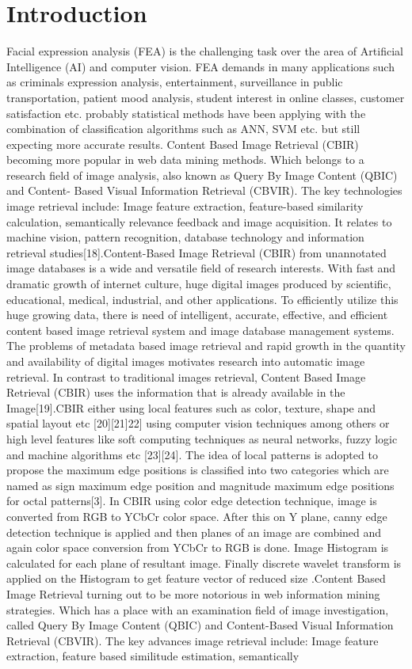 \documentclass[review]{elsarticle}
\begin{document}
\section{Introduction}
\label{intro-chapter}
Facial expression analysis (FEA) is the challenging task over the area of Artificial Intelligence (AI) and computer vision. FEA demands in many applications such as criminals expression analysis, entertainment, surveillance in public transportation, patient mood analysis, student interest in online classes, customer satisfaction etc. probably statistical methods have been applying with the combination of classification algorithms such as ANN, SVM etc. but still expecting more accurate results.
Content Based Image Retrieval (CBIR) becoming more popular in web data mining methods. Which belongs to a research field of image analysis, also known as Query By Image Content (QBIC) and Content- Based Visual Information Retrieval (CBVIR). The key technologies image retrieval include: Image feature extraction, feature-based similarity calculation, semantically relevance feedback and image acquisition. It relates to machine vision, pattern recognition, database technology and information retrieval studies[18].Content-Based Image Retrieval (CBIR) from unannotated image databases is a wide and versatile field of research interests. With fast and dramatic growth of internet culture, huge digital images produced by scientific, educational, medical, industrial, and other applications. To efficiently utilize this huge growing data, there is need of intelligent, accurate, effective, and efficient content based image retrieval system and image database management systems. The problems of metadata based image retrieval and rapid growth in the quantity and availability of digital images motivates research into automatic image retrieval. In contrast to traditional images retrieval, Content Based Image Retrieval (CBIR) uses the information that is already available in the Image[19].CBIR either using local features such as color, texture, shape and spatial layout etc [20][21]22] using computer vision techniques among others or high level features like soft computing techniques as neural networks, fuzzy logic and machine algorithms etc [23][24]. The idea of local patterns is adopted to propose the maximum edge positions is classified into two categories which are named as sign maximum edge position and magnitude maximum edge positions for octal patterns[3]. In CBIR using color edge detection technique, image is converted from RGB to YCbCr color space. After this on Y plane, canny edge detection technique is applied and then planes of an image are combined and again color space conversion from YCbCr to RGB is done. Image Histogram is calculated for each plane of resultant image. Finally discrete wavelet transform is applied on the Histogram to get feature vector of reduced size .Content Based Image Retrieval turning out to be more notorious in web information mining strategies. Which has a place with an examination field of image investigation, called Query By Image Content (QBIC) and Content-Based Visual Information Retrieval (CBVIR). The key advances image retrieval include: Image feature extraction, feature based similitude estimation, semantically 
\end{document}
